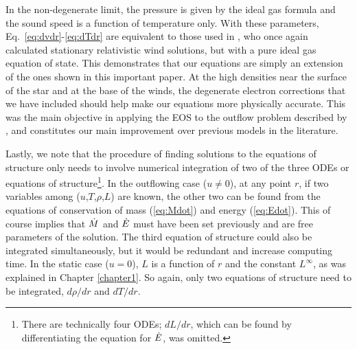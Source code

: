 \documentclass[../main.tex]{subfiles}
\begin{document}
In the non-degenerate limit, the pressure is given by the ideal gas formula and the sound speed is a function of temperature only. With these parameters, Eq.~\eqref{eq:dvdr}-\eqref{eq:dTdr} are equivalent to those used in \citet{Paczynski1986b}, who once again calculated stationary relativistic wind solutions, but with a pure ideal gas equation of state. This demonstrates that our equations are simply an extension of the ones shown in this important paper. At the high densities near the surface of the star and at the base of the winds, the degenerate electron corrections that we have included should help make our equations more physically accurate. This was the main objective in applying the \citet{Paczynski1983} EOS to the outflow problem described by \citet{Paczynski1986b}, and constitutes our main improvement over previous models in the literature.

Lastly, we note that the procedure of finding solutions to the equations of structure only needs to involve numerical integration of two of the three ODEs or equations of structure\footnote{There are technically four ODEs; $dL/dr$, which can be found by differentiating the equation for $\dot{E}$, was omitted.}. In the outflowing case ($u\neq 0$), at any point $r$, if two variables among ($u$,$T$,$\rho$,$L$) are known, the other two can be found from the equations of conservation of mass (\ref{eq:Mdot}) and energy (\ref{eq:Edot}). This of course implies that $\dot{M}$ and $\dot{E}$ must have been set previously and are free parameters of the solution. The third equation of structure could also be integrated simultaneously, but it would be redundant and increase computing time. In the static case ($u=0$), $L$ is a function of $r$ and the constant $L^\infty$, as was explained in Chapter \ref{chapter1}. So again, only two equations of structure need to be integrated, $d\rho/dr$ and $dT/dr$.

\biblio
\end{document}

